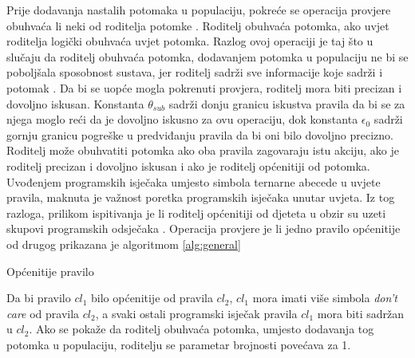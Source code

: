\documentclass[times, utf8, zavrsni]{fer}
\begin{document}
Prije dodavanja nastalih potomaka u populaciju, pokreće se operacija provjere obuhvaća li neki od roditelja potomke .
Roditelj obuhvaća potomka, ako uvjet roditelja logički obuhvaća uvjet potomka.
Razlog ovoj operaciji je taj što u slučaju da roditelj obuhvaća potomka, dodavanjem potomka u populaciju ne bi se poboljšala sposobnost sustava, jer roditelj sadrži sve informacije koje sadrži i potomak \citep{1}.
Da bi se uopće mogla pokrenuti provjera, roditelj mora biti precizan i dovoljno iskusan.
Konstanta $\theta_{sub}$ sadrži donju granicu iskustva pravila da bi se za njega moglo reći da je dovoljno iskusno za ovu operaciju, dok konstanta $\epsilon_{0}$ sadrži gornju granicu pogreške u predviđanju pravila da bi oni bilo dovoljno precizno.
Roditelj može obuhvatiti potomka ako oba pravila zagovaraju istu akciju, ako je roditelj precizan i dovoljno iskusan i ako je roditelj općenitiji od potomka.
Uvođenjem programskih isječaka umjesto simbola ternarne abecede u uvjete pravila, maknuta je važnost poretka programskih isječaka unutar uvjeta.
Iz tog razloga, prilikom ispitivanja je li roditelj općenitiji od djeteta u obzir su uzeti skupovi programskih odsječaka \citep{4}.
Operacija provjere je li jedno pravilo općenitije od drugog prikazana je algoritmom \ref{alg:general}
\begin{algorithm}
    \caption{Općenitije pravilo}
    \label{alg:general}
    \begin{algorithmic}
        \ENDIF
        \ENDIF
    \end{algorithmic}
\end{algorithm}
Da bi pravilo $cl_{1}$ bilo općenitije od pravila $cl_{2}$, $cl_{1}$ mora imati više simbola \emph{don't care} od pravila $cl_{2}$, a svaki ostali programski isječak pravila $cl_{1}$ mora biti sadržan u $cl_{2}$.
Ako se pokaže da roditelj obuhvaća potomka, umjesto dodavanja tog potomka u populaciju, roditelju se parametar brojnosti povećava za 1.
\end{document}

